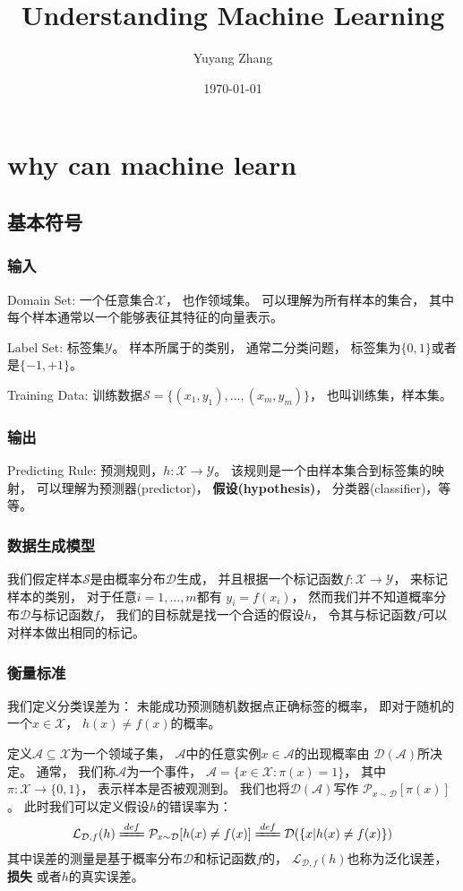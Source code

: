 \documentclass[UTF8]{ctexart}
\title{Understanding Machine Learning}
\author{Yuyang Zhang}
\date{\today}
\begin{document}
\maketitle
\newpage

\tableofcontents
\newpage


\section{why can machine learn}
\subsection{基本符号}
\subsubsection{输入}
Domain Set:
一个任意集合$\mathcal{X}$，
也作领域集。
可以理解为所有样本的集合，
其中每个样本通常以一个能够表征其特征的向量表示。

Label Set:
标签集$\mathcal{Y}$。
样本所属于的类别，
通常二分类问题，
标签集为$\{0,1\}$或者是$\{-1,+1\}$。

Training Data:
训练数据$\mathcal{S}=\{(x_1,y_1),...,(x_m,y_m)\}$，
也叫训练集，样本集。

\subsubsection{输出}
Predicting Rule:
预测规则，$h:\mathcal{X}\rightarrow\mathcal{Y}$。
该规则是一个由样本集合到标签集的映射，
可以理解为预测器(predictor)，
\textbf	{假设(hypothesis)}，
分类器(classifier)，等等。

\subsubsection{数据生成模型}
我们假定样本$\mathcal{S}$是由概率分布$\mathcal{D}$生成，
并且根据一个标记函数$f:\mathcal{X}\rightarrow\mathcal{Y}$，
来标记样本的类别，
对于任意$i=1,...,m$都有
$y_i=f(x_i)$，
然而我们并不知道概率分布$\mathcal{D}$与标记函数$f$，
我们的目标就是找一个合适的假设$h$，
令其与标记函数$f$可以对样本做出相同的标记。

\subsubsection{衡量标准}
我们定义分类误差为：
未能成功预测随机数据点正确标签的概率，
即对于随机的一个$x\in\mathcal{X}$，
$h(x)\neq f(x)$的概率。


定义$\mathcal{A}\subseteq\mathcal{X}$为一个领域子集，
$\mathcal{A}$中的任意实例$x\in\mathcal{A}$的出现概率由
$\mathcal{D}(\mathcal{A})$所决定。
通常，
我们称$\mathcal{A}$为一个事件，
$\mathcal{A}=\{x\in\mathcal{X}:\pi(x)=1\}$，
其中$\pi:\mathcal{X}\rightarrow\{0,1\}$，
表示样本是否被观测到。
我们也将$\mathcal{D}(\mathcal{A})$写作
$\mathcal{P}_{x\sim\mathcal{D}} [\pi(x)]$。
此时我们可以定义假设$h$的错误率为：
$$
\mathcal{L}_{\mathcal{D},f}(h)\xlongequal{def}
\mathcal{P}_{x\sim\mathcal{D}} [h(x)\neq f(x)]\xlongequal{def}
\mathcal{D}(\{x|h(x)\neq f(x)\})
$$
其中误差的测量是基于概率分布$\mathcal{D}$和标记函数$f$的，
$\mathcal{L}_{\mathcal{D},f}(h)$也称为泛化误差，
\textbf{损失}
或者$h$的真实误差。
\end{document}
